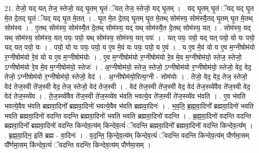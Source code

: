 \documentclass[17pt]{extarticle}
\begin{document}
21. तेजो॒ यद् यत् तेज॒ स्तेजो॒ यद् घृ॒तम् घृ॒तं ॅयत् तेज॒ स्तेजो॒ यद् घृ॒तम् । . यद् घृ॒तम् घृ॒तं ॅयद् यद् घृ॒त मे॒त दे॒तद् घृ॒तं ॅयद् यद् घृ॒त मे॒तत् । . घृ॒त मे॒त दे॒तद् घृ॒तम् घृ॒त मे॒तथ् सोम॑स्य॒ सोम॑स्यै॒तद् घृ॒तम् घृ॒त मे॒तथ् सोम॑स्य । . ए॒तथ् सोम॑स्य॒ सोम॑स्यै॒त दे॒तथ् सोम॑स्य॒ यद् यथ् सोम॑स्यै॒त दे॒तथ् सोम॑स्य॒ यत् । . सोम॑स्य॒ यद् यथ् सोम॑स्य॒ सोम॑स्य॒ यत् पयः॒ पयो॒ यथ् सोम॑स्य॒ सोम॑स्य॒ यत् पयः॑ । . यत् पयः॒ पयो॒ यद् यत् पयो॒ यो यः पयो॒ यद् यत् पयो॒ यः । . पयो॒ यो यः पयः॒ पयो॒ य ए॒व मे॒वं यः पयः॒ पयो॒ य ए॒वं । . य ए॒व मे॒वं यो य ए॒व म॒ग्नीषोम॑यो र॒ग्नीषोम॑यो रे॒वं यो य ए॒व म॒ग्नीषोम॑योः । . ए॒व म॒ग्नीषोम॑यो र॒ग्नीषोम॑यो रे॒व मे॒व म॒ग्नीषोम॑यो॒ स्तेज॒ स्तेजो॒ ऽग्नीषोम॑यो रे॒व मे॒व म॒ग्नीषोम॑यो॒ स्तेजः॑ । . अ॒ग्नीषोम॑यो॒ स्तेज॒ स्तेजो॒ ऽग्नीषोम॑यो र॒ग्नीषोम॑यो॒ स्तेजो॒ वेद॒ वेद॒ तेजो॒ ऽग्नीषोम॑यो र॒ग्नीषोम॑यो॒ स्तेजो॒ वेद॑ । . अ॒ग्नीषोम॑यो॒रित्य॒ग्नी - सोम॑योः । . तेजो॒ वेद॒ वेद॒ तेज॒ स्तेजो॒ वेद॑ तेज॒स्वी ते॑ज॒स्वी वेद॒ तेज॒ स्तेजो॒ वेद॑ तेज॒स्वी । . वेद॑ तेज॒स्वी ते॑ज॒स्वी वेद॒ वेद॑ तेज॒स्व्ये॑वैव ते॑ज॒स्वी वेद॒ वेद॑ तेज॒स्व्ये॑व । . ते॒ज॒स्व्ये॑वैव ते॑ज॒स्वी ते॑ज॒स्व्ये॑व भ॑वति भवत्ये॒व ते॑ज॒स्वी ते॑ज॒स्व्ये॑व भ॑वति । . ए॒व भ॑वति भवत्ये॒वैव भ॑वति ब्रह्मवा॒दिनो᳚ ब्रह्मवा॒दिनो॑ भवत्ये॒वैव भ॑वति ब्रह्मवा॒दिनः॑ । . भ॒व॒ति॒ ब्र॒ह्म॒वा॒दिनो᳚ ब्रह्मवा॒दिनो॑ भवति भवति ब्रह्मवा॒दिनो॑ वदन्ति वदन्ति ब्रह्मवा॒दिनो॑ भवति भवति ब्रह्मवा॒दिनो॑ वदन्ति । . ब्र॒ह्म॒वा॒दिनो॑ वदन्ति वदन्ति ब्रह्मवा॒दिनो᳚ ब्रह्मवा॒दिनो॑ वदन्ति किन्देव॒त्य॑म् किन्देव॒त्यं॑ ॅवदन्ति ब्रह्मवा॒दिनो᳚ ब्रह्मवा॒दिनो॑ वदन्ति किन्देव॒त्य᳚म् । . ब्र॒ह्म॒वा॒दिन॒ इति॑ ब्रह्म - वा॒दिनः॑ । . व॒द॒न्ति॒ कि॒न्दे॒व॒त्य॑म् किन्देव॒त्यं॑ ॅवदन्ति वदन्ति किन्देव॒त्य॑म् पौर्णमा॒सम् पौ᳚र्णमा॒सम् कि॑न्देव॒त्यं॑ ॅवदन्ति वदन्ति किन्देव॒त्य॑म् पौर्णमा॒सम् । \newline
\end{document}
